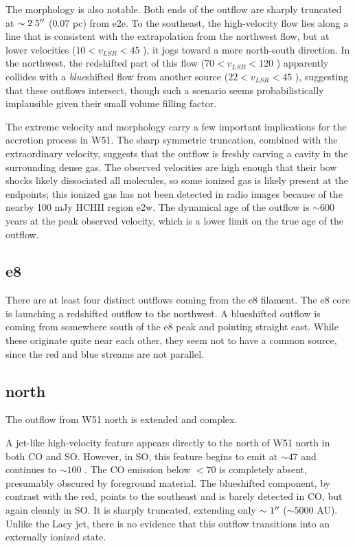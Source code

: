 \documentclass{aa}
\begin{document}
The morphology is also notable.  Both ends of the outflow are sharply truncated
at $\sim2.5\mbox{$^{\prime\prime}$}$ (0.07 pc) from e2e. To the southeast, the high-velocity
flow lies along a line that is consistent with the extrapolation from the
northwest flow,
but at lower velocities ($10 < v_{LSR} < 45$ \kms), it jogs toward a more
north-south direction.  In the northwest, the redshifted part of this flow ($70
< v_{LSR} < 120$ \kms) apparently collides with a \emph{blue}shifted flow from
another source ($22 < v_{LSR} < 45$ \kms), suggesting that these outflows
intersect, though such a scenario seems probabilistically implausible given
their small volume filling factor.

The extreme velocity and morphology carry a few important implications for the
accretion process in W51.  The sharp symmetric truncation, combined with the
extraordinary velocity, suggests that the outflow is freshly carving a cavity
in the surrounding dense gas.  The observed velocities are high enough that
their bow shocks likely dissociated all molecules, so some ionized gas is
likely present at the endpoints; this ionized gas has not been detected in
radio images because of the nearby 100 mJy HCHII region e2w.  The dynamical age
of the outflow is $\sim600$ years at the peak observed velocity, which is a
lower limit on the true age of the outflow.

\subsection{e8}
There are at least four distinct outflows coming from the e8 filament.
The e8 core is launching a redshifted outflow to the northwest.  A blueshifted
outflow is coming from somewhere south of the e8 peak and pointing straight
east.  While these originate quite near each other, they seem not to have
a common source, since the red and blue streams are not parallel.

\subsection{north}
The outflow from W51 north is extended and complex.

A jet-like high-velocity feature appears directly to the north of W51 north in
both CO and SO.  However, in SO, this feature begins to emit at $\sim47$ \kms
and continues to $\sim 100$ \kms.  The CO emission below $<70$ \kms is
completely absent, presumably obscured by foreground material.  The blueshifted
component, by contrast with the red, points to the southeast and is barely
detected in CO, but again cleanly in SO.  It is sharply truncated, extending
only $\sim1 \mbox{$^{\prime\prime}$}$ ($\sim5000$ AU).  Unlike the Lacy jet, there is no
evidence that this outflow transitions into an externally ionized state.
\end{document}
